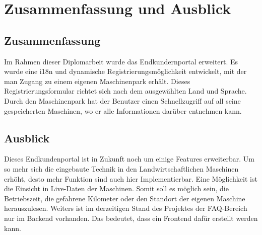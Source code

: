 \chapter{Zusammenfassung und Ausblick}
\section{Zusammenfassung}
Im Rahmen dieser Diplomarbeit wurde das Endkundernportal erweitert. Es wurde eine i18n und dynamische Registrierungsmöglichkeit entwickelt, mit der man Zugang zu einem eigenen Maschinenpark erhält. Dieses Registrierungsformular richtet sich nach dem ausgewählten Land und Sprache. Durch den Maschinenpark hat der Benutzer einen Schnellzugriff auf all seine gespeicherten Maschinen, wo er alle Informationen darüber entnehmen kann.
\section{Ausblick}
Dieses Endkundenportal ist in Zukunft noch um einige Features erweiterbar. Um so mehr sich die eingebaute Technik in den Landwirtschaftlichen Maschinen erhöht, desto mehr Funktion sind auch hier Implementierbar. Eine Möglichkeit ist die Einsicht in Live-Daten der Maschinen. Somit soll es möglich sein, die Betriebszeit, die gefahrene Kilometer oder den Standort der eigenen Maschine herauszulesen. Weiters ist im derzeitigen Stand des Projektes der FAQ-Bereich nur im Backend vorhanden. Das bedeutet, dass ein Frontend dafür erstellt werden kann.